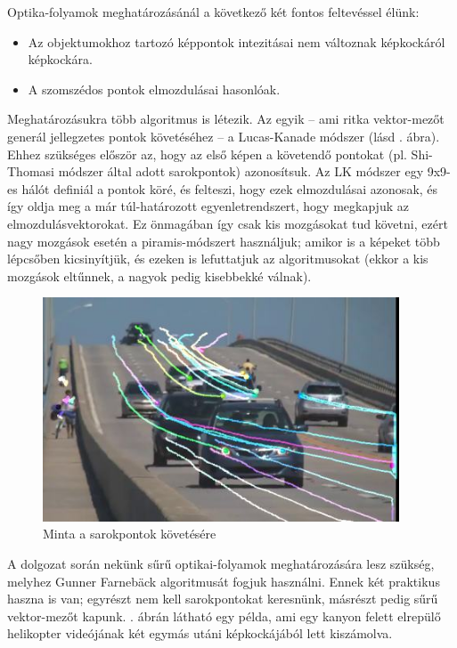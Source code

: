 Optika-folyamok meghatározásánál a következő két fontos feltevéssel élünk:
\begin{itemize}
\item Az objektumokhoz tartozó képpontok intezitásai nem változnak képkockáról képkockára.
\item A szomszédos pontok elmozdulásai hasonlóak.
\end{itemize}

Meghatározásukra több algoritmus is létezik. Az egyik -- ami ritka vektor-mezőt generál jellegzetes pontok követéséhez -- a Lucas-Kanade \cite{LK} módszer (lásd . ábra). Ehhez szükséges először az, hogy az első képen a követendő pontokat (pl. Shi-Thomasi \cite{shi-thomasi} módszer által adott sarokpontok) azonosítsuk. Az LK módszer egy 9x9-es hálót definiál a pontok köré, és felteszi, hogy ezek elmozdulásai azonosak, és így oldja meg a már túl-határozott egyenletrendszert, hogy megkapjuk az elmozdulásvektorokat. Ez önmagában így csak kis mozgásokat tud követni, ezért nagy mozgások esetén a piramis-módszert használjuk; amikor is a képeket több lépcsőben kicsinyítjük, és ezeken is lefuttatjuk az algoritmusokat (ekkor a kis mozgások eltűnnek, a nagyok pedig kisebbekké válnak).

\begin{figure}[tbh]
\centering
\includegraphics[width=300pt]{figures/opticalflow_lk.jpg}
\caption{Minta a sarokpontok követésére \cite{opencv-lk} \label{fig:lk}}
\end{figure}

A dolgozat során nekünk sűrű optikai-folyamok meghatározására lesz szükség, melyhez Gunner Farnebäck \cite{farneback} algoritmusát fogjuk használni. Ennek két praktikus haszna is van; egyrészt nem kell sarokpontokat keresnünk, másrészt pedig sűrű vektor-mezőt kapunk. . ábrán látható egy példa, ami egy kanyon felett elrepülő helikopter videójának két egymás utáni képkockájából lett kiszámolva.

